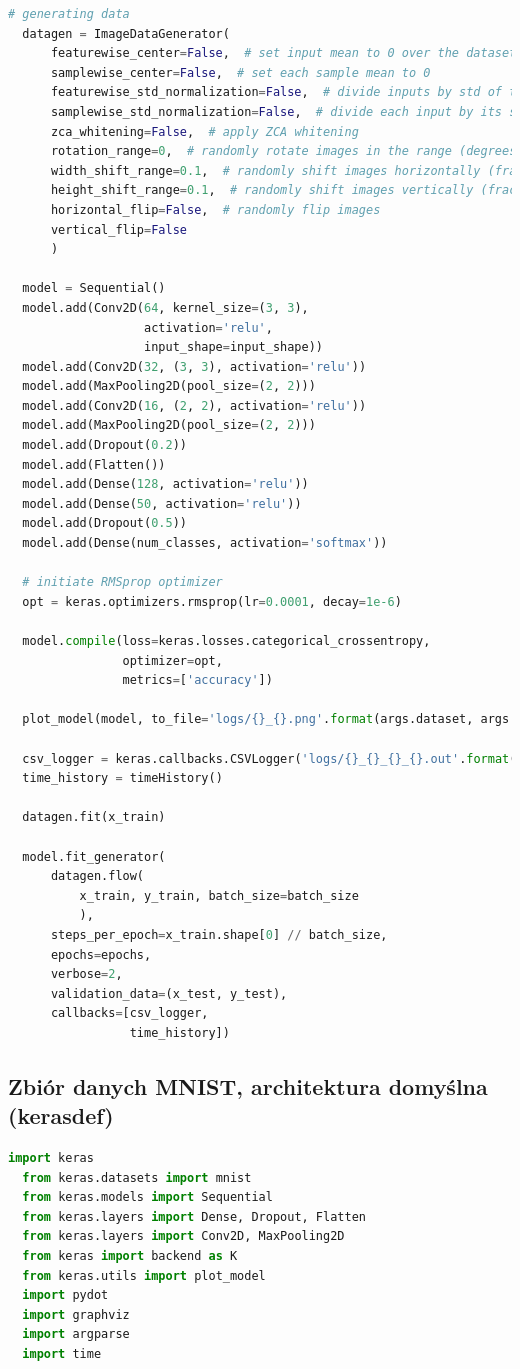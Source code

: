 \documentclass[12pt,a4paper,twoside]{article}
\begin{document}
\begin{appendices}
\begin{lstlisting}[language=python]
  # generating data
  datagen = ImageDataGenerator(
      featurewise_center=False,  # set input mean to 0 over the dataset
      samplewise_center=False,  # set each sample mean to 0
      featurewise_std_normalization=False,  # divide inputs by std of the dataset
      samplewise_std_normalization=False,  # divide each input by its std
      zca_whitening=False,  # apply ZCA whitening
      rotation_range=0,  # randomly rotate images in the range (degrees, 0 to 180)
      width_shift_range=0.1,  # randomly shift images horizontally (fraction of total width)
      height_shift_range=0.1,  # randomly shift images vertically (fraction of total height)
      horizontal_flip=False,  # randomly flip images
      vertical_flip=False
      )

  model = Sequential()
  model.add(Conv2D(64, kernel_size=(3, 3),
                   activation='relu',
                   input_shape=input_shape))
  model.add(Conv2D(32, (3, 3), activation='relu'))
  model.add(MaxPooling2D(pool_size=(2, 2)))
  model.add(Conv2D(16, (2, 2), activation='relu'))
  model.add(MaxPooling2D(pool_size=(2, 2)))
  model.add(Dropout(0.2))
  model.add(Flatten())
  model.add(Dense(128, activation='relu'))
  model.add(Dense(50, activation='relu'))
  model.add(Dropout(0.5))
  model.add(Dense(num_classes, activation='softmax'))

  # initiate RMSprop optimizer
  opt = keras.optimizers.rmsprop(lr=0.0001, decay=1e-6)

  model.compile(loss=keras.losses.categorical_crossentropy,
                optimizer=opt,
                metrics=['accuracy'])

  plot_model(model, to_file='logs/{}_{}.png'.format(args.dataset, args.architecture))

  csv_logger = keras.callbacks.CSVLogger('logs/{}_{}_{}_{}.out'.format(args.run_date, args.dataset, args.architecture, args.instance_type))
  time_history = timeHistory()

  datagen.fit(x_train)

  model.fit_generator(
      datagen.flow(
          x_train, y_train, batch_size=batch_size
          ),
      steps_per_epoch=x_train.shape[0] // batch_size,
      epochs=epochs,
      verbose=2,
      validation_data=(x_test, y_test),
      callbacks=[csv_logger,
                 time_history])
\end{lstlisting}
\clearpage
\subsection{Zbiór danych MNIST, architektura domyślna (kerasdef)}
\begin{lstlisting}[language=python]
  import keras
  from keras.datasets import mnist
  from keras.models import Sequential
  from keras.layers import Dense, Dropout, Flatten
  from keras.layers import Conv2D, MaxPooling2D
  from keras import backend as K
  from keras.utils import plot_model
  import pydot
  import graphviz
  import argparse
  import time


\end{lstlisting}
\end{appendices}
\end{document}
